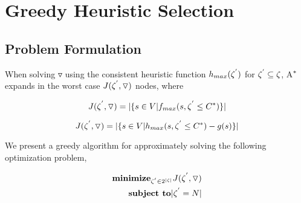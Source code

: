 
 
\chapter{Greedy Heuristic Selection}\label{ghs}


\section{Problem Formulation}
When solving $\triangledown$ using the consistent heuristic function $h_{max}(\zeta\sp{'})$ for $\zeta\sp{'} \subseteq \zeta$, A$\sp{*}$ expands in the worst case $J(\zeta\sp{'}, \triangledown)$ nodes, where

\begin{equation}
J(\zeta\sp{'},\triangledown) = |\{s \in V | f_{max}(s,\zeta\sp{'} \leq C\sp{*})\}|
\label{eq:eq_size_search_tree_1}
\end{equation}

\begin{equation}
J(\zeta\sp{'},\triangledown) = |\{s \in V | h_{max}(s,\zeta\sp{'} \leq C\sp{*}) - g(s)\}|
\label{eq:eq_size_search_tree_2}
\end{equation}

We present a greedy algorithm for approximately solving the following optimization problem,

\begin{equation}
\begin{split}
\textbf{minimize}_{\zeta\sp{'} \in 2\sp{|\zeta|}}J(\zeta\sp{'}, \triangledown) \\
\textbf{subject to} |\zeta\sp{'} = N|
\end{split}
\end{equation}

